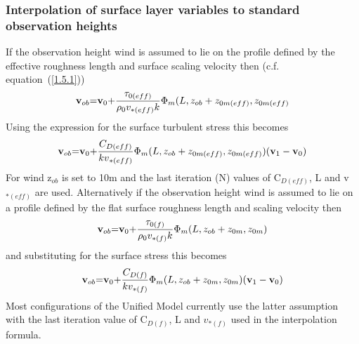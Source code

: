 \documentclass{UMDP_article}
\begin{document}
\subsubsection{Interpolation of surface layer variables to standard
  observation heights}\label{section_2.3}
If the observation height wind is assumed to lie on the profile
defined by the effective roughness length and surface scaling velocity
then (c.f.  equation~(\ref{1.5.1}))
\begin{equation}
  {\rm {\bf v}}_{{ob}} { = } {\rm {\bf v}}_{0} { +
  }\frac{ {\rm {\bf \tau }}_{{0(eff)}} }{ \rho _0 v_{\ast (eff)} k}
  \Phi _m (L, z_{ob} + z_{0m(eff)} , z_{0m(eff)}
  \label{2.3.1}
\end{equation}
Using the expression for the surface turbulent stress this becomes
\begin{equation}
  {\rm {\bf v}}_{{ob}} { = } {\rm {\bf v}}_{0} { +
  }\frac{ C_{D(eff)} }{ {kv}_{\ast (eff)} } \Phi _m (L, z_{ob} +
  z_{0m(eff)} , z_{0m(eff)} ) ( {\rm {\bf v}}_1 - {\rm {\bf v}}_{0}
  {)}
  \label{2.3.2}
\end{equation}
For wind z$_{ob}$ is set to 10m and the last iteration (N) values of
C$_{D(eff)}$, L and v$_{\ast (eff)}$ are used.  Alternatively if the
observation height wind is assumed to lie on a profile defined by the
flat surface roughness length and scaling velocity then
\begin{equation}
  {\rm {\bf v}}_{{ob}} { = } {\rm {\bf v}}_{0} { +
  }\frac{ {\rm {\bf \tau }}_{{0(f)}} }{ \rho _0 v_{\ast (f)} k} \Phi
  _m (L, z_{ob} + z_{0m} , z_{0m} )
  \label{2.3.3}
\end{equation}
and substituting for the surface stress this becomes
\begin{equation}
  {\rm {\bf v}}_{{ob}} { = } {\rm {\bf v}}_{0} { +
  }\frac{ C_{D(f)} }{k v_{\ast (f)} } \Phi _m (L, z_{ob} + z_{0m} ,
  z_{0m} ) ( {\rm {\bf v}}_1 - {\rm {\bf v}}_{0} {)}
  \label{2.3.4}
\end{equation}
Most configurations of the Unified Model currently use the latter
assumption with the last iteration value of C$_{D(f)}$, L and $v_{\ast
  (f)}$ used in the interpolation formula.
\end{document}
